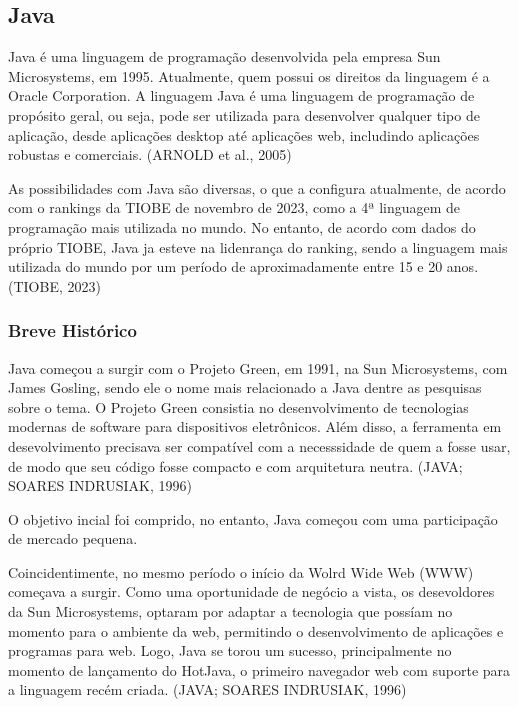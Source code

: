\documentclass[a4paper,12pt]{article}
\begin{document}
\subsection{Java}
Java é uma linguagem de programação desenvolvida pela empresa Sun Microsystems, em 1995. Atualmente, quem possui os direitos da 
linguagem é a Oracle Corporation. A linguagem Java é uma linguagem de programação de propósito geral, ou seja, pode ser utilizada 
para desenvolver qualquer tipo de aplicação, desde aplicações desktop até aplicações web, includindo aplicações robustas e comerciais. (ARNOLD et al., 2005)

As possibilidades com Java são diversas, o que a configura atualmente, de acordo com o rankings da TIOBE de novembro de 2023, como a 4ª linguagem de programação
mais utilizada no mundo. No entanto, de acordo com dados do próprio TIOBE, Java ja esteve na lidenrança do ranking, sendo a linguagem mais utilizada do mundo
por um período de aproximadamente entre 15 e 20 anos. (TIOBE, 2023)

\subsubsection{Breve Histórico}
Java começou a surgir com o Projeto Green, em 1991, na Sun Microsystems, com James Gosling, sendo ele o nome mais relacionado a Java dentre as pesquisas 
sobre o tema. O Projeto Green consistia no desenvolvimento de tecnologias modernas de software para dispositivos eletrônicos. Além disso, a ferramenta
em desevolvimento precisava ser compatível com a necesssidade de quem a fosse usar, de modo que seu código fosse compacto e com arquitetura neutra. (JAVA; SOARES INDRUSIAK, 1996)


O objetivo incial foi comprido, no entanto, Java começou com uma participação de mercado pequena. 

Coincidentimente, no mesmo período o início da Wolrd Wide Web (WWW) começava a surgir. Como uma oportunidade de negócio a vista, os desevoldores da Sun
Microsystems, optaram por adaptar a tecnologia que possíam no momento para o ambiente da web, permitindo o desenvolvimento de aplicações e programas para web.
Logo, Java se torou um sucesso, principalmente no momento de lançamento do HotJava, o primeiro navegador web com suporte para a linguagem recém criada. (JAVA; SOARES INDRUSIAK, 1996)
\end{document}
